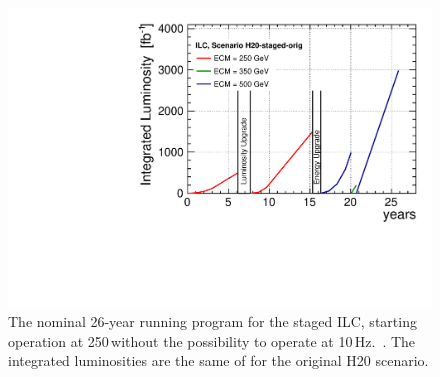 \begin{figure}
\begin{center}
\includegraphics[width=0.85\hsize]{chapters/figures/lumi_H20-staged-orig}
\end{center}
\caption{The nominal 26-year running program for the staged ILC, starting operation at 250\,\GeV without the possibility to operate at 10\,Hz.~\cite{Fujii:2017vwa}. The integrated luminosities are the same of for the original H20 scenario.}
\label{fig:H20staged-orig}
\end{figure}

